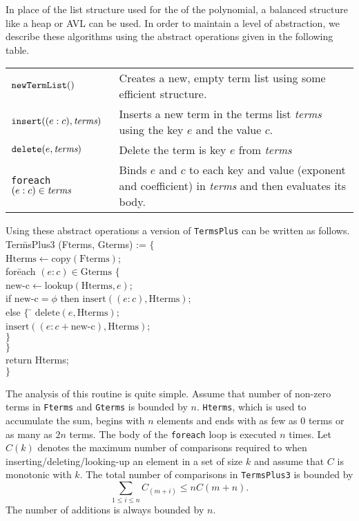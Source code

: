 In place of the list structure used for the  of the
polynomial, a balanced structure like a heap or AVL can be used.  In
order to maintain a level of abstraction, we describe these algorithms
using the abstract operations given in the following table.

\begin{center}
\begin{tabular}{lp{2.25in}}
$\mbox{\tt newTermList}()$ & Creates a new, empty term list using some
efficient structure.\\ 
$\mbox{\tt insert}((e : c), \mbox{\em terms})$& Inserts a new term in
the terms list {\em terms} using the key $e$ and the value $c$. \\ 
$\mbox{\tt delete}(e, \mbox{\em terms})$& Delete the term is key $e$ from
{\em terms} \\ 
{\tt foreach $(e : c) \in \mbox{\em terms}$} & Binds $e$ and $c$ to
each key and value (exponent and coefficient) in {\em terms} and then
evaluates its body. 
\end{tabular}
\end{center}

Using these abstract operations a version of {\tt TermsPlus} can be
written as follows. 
\begindsacode
Ter\=msPlus3 (Fterms, Gterms) := $\{$ \\
\> $\mbox{Hterms} \leftarrow \mbox{copy}(\mbox{Fterms})$; \\
\> for\=each $(e : c) \in \mbox{Gterms}$ $\{$ \\
\>\> $\mbox{new-c} \leftarrow \mbox{lookup}(\mbox{Hterms}, e)$; \\
\>\> if $\mbox{new-c} = \phi$ then $\mbox{insert}((e : c), \mbox{Hterms})$;\\
\>\> else $\{$ \= $\mbox{delete}(e, \mbox{Hterms})$;\\
\>\>\> $\mbox{insert}((e : c + \mbox{new-c}), \mbox{Hterms})$; \\
\>\>\> $\}$\\
\>\> $\}$ \\
\> return Hterms; \\
\> $\}$
\enddsacode

The analysis of this routine is quite simple.  Assume that number of
non-zero terms in {\tt Fterms} and {\tt Gterms} is bounded by $n$.
{\tt Hterms}, which is used to accumulate the sum, begins with $n$
elements and ends with as few as $0$ terms or as many as $2n$ terms.
The body of the {\tt foreach} loop is executed $n$ times.  Let $C(k)$
denotes the maximum number of comparisons required to when
inserting/deleting/looking-up an element in a set of size $k$ and
assume that $C$ is monotonic with $k$.  The total number of
comparisons in {\tt TermsPlus3} is bounded by
\[
\sum_{1 \le i \le n} C_(m+i) \le n C(m+n).
\]
The number of additions is always bounded by $n$.  

